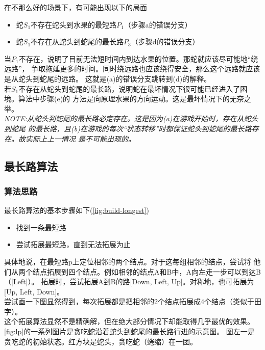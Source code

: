\documentclass[a4paper]{article}
\begin{document}
在不那么好的场景下，有可能出现以下的局面
\begin{itemize}
    \item 蛇$S_1$不存在蛇头到水果的最短路$P_1$（步骤a的错误分支）
    \item 蛇$S_1$不存在从蛇头到蛇尾的最长路$P_3$（步骤d的错误分支）
\end{itemize}
当$P_1$不存在，说明了目前无法短时间内到达水果的位置。那蛇就应该尽可能地``绕远路''，
争取拖延更多的时间。同时绕远路也应该绕得安全，那么这个远路就应该是从蛇头到蛇尾的远路。
这就是(a)的错误分支跳转到(d)的解释。\\

若$S_1$不存在从蛇头到蛇尾的最长路，说明蛇在最坏情况下很可能已经进入了困境。算法中步骤(e)的
方法是向原理水果的方向运动。这是最坏情况下的无奈之举。\\

\emph{NOTE:从蛇头到蛇尾的最长路必定存在。这是因为(a)在游戏开始时，存在从蛇头到蛇尾
的最长路，且(b)在游戏的每次``状态转移''时都保证蛇头到蛇尾的最长路存在。故实际上上一情况
是不可能出现的。}

\subsection{最长路算法}
\subsubsection{算法思路}
最长路算法的基本步骤如下(\autoref{fig:build-longest})
\begin{itemize}
    \item 找到一条最短路
    \item 尝试拓展最短路，直到无法拓展为止
\end{itemize}
具体地说，在最短路p上定位相邻的两个结点。对于这每组相邻的结点，尝试将
他们从两个结点拓展到四个结点。例如相邻的结点A和B中，A向左走一步可以到达B（[Left]）。
拓展时，尝试拓展A到B的路[Down, Left, Up]。对称地，也可拓展为[Up, Left, Down]。\\

尝试画一下图显然得到，每次拓展都是把相邻的2个结点拓展成4个结点（类似于田字）。\\

这个拓展算法显然不是精确解，但在绝大部分情况下却能取得几乎最优的效果。\\


\autoref{fig:lp}的一系列图片是贪吃蛇沿着蛇头到蛇尾的最长路行进的示意图。
图左一是贪吃蛇的初始状态。红方块是蛇头，贪吃蛇（蜷缩）在一团。\\
\end{document}
